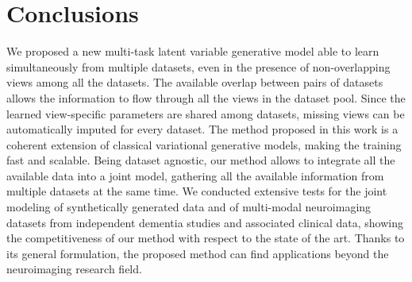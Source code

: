 \section{Conclusions}
We proposed a new multi-task latent variable generative model able to learn simultaneously from multiple datasets, even in the presence of non-overlapping views among all the datasets.
The available overlap between pairs of datasets allows the information to flow through all the views in the dataset pool.
Since the learned view-specific parameters are shared among datasets, missing views can be automatically imputed for every dataset.
The method proposed in this work is a coherent extension of classical variational generative models, making the training fast and scalable.
Being dataset agnostic, our method allows to integrate all the available data into a joint model, gathering  all the available information from multiple datasets at the same time.
We conducted extensive tests for the joint modeling of synthetically generated data and of multi-modal neuroimaging datasets from independent dementia studies and associated clinical data, showing the competitiveness of our method with respect to the state of the art.
Thanks to its general formulation, the proposed method can find applications beyond the neuroimaging research field.
